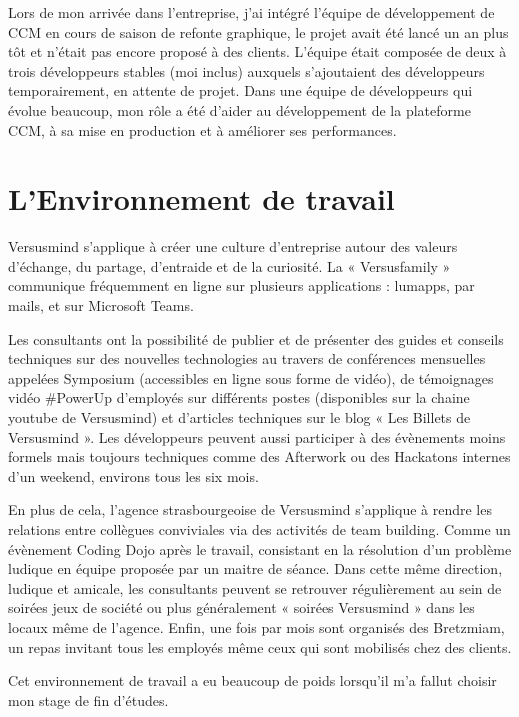 \documentclass[12pt, a4paper]{report}
\newcommand\tab[1][1cm]{\hspace*{#1}}
\begin{document}
Lors de mon arrivée dans l’entreprise, j’ai intégré l’équipe de développement de CCM en cours de
saison de refonte graphique, le projet avait été lancé un an plus tôt et n’était pas encore proposé à des
clients. L’équipe était composée de deux à trois développeurs stables (moi inclus) auxquels s’ajoutaient
des développeurs temporairement, en attente de projet.
Dans une équipe de développeurs qui évolue beaucoup, mon rôle a été d'aider au développement de la plateforme CCM, à sa mise en production et à améliorer ses performances.

\section{L’Environnement de travail}
\tab{}Versusmind s’applique à créer une culture d’entreprise autour des valeurs d’échange, du partage,
d’entraide et de la curiosité. La « Versusfamily » communique fréquemment en ligne sur plusieurs
applications : lumapps, par mails, et sur Microsoft Teams.\newline

Les consultants ont la possibilité de publier et de présenter des guides et conseils techniques sur des
nouvelles technologies au travers de conférences mensuelles appelées Symposium (accessibles en
ligne sous forme de vidéo), de témoignages vidéo \#PowerUp d’employés sur différents postes
(disponibles sur la chaine youtube de Versusmind) et d’articles techniques sur le blog « Les Billets de
Versusmind ». Les développeurs peuvent aussi participer à des évènements moins formels mais
toujours techniques comme des Afterwork ou des Hackatons internes d’un weekend, environs tous les
six mois.\newline

En plus de cela, l’agence strasbourgeoise de Versusmind s’applique à rendre les relations entre
collègues conviviales via des activités de team building. Comme un évènement Coding Dojo après le
travail, consistant en la résolution d’un problème ludique en équipe proposée par un maitre de séance.
Dans cette même direction, ludique et amicale, les consultants peuvent se retrouver régulièrement au
sein de soirées jeux de société ou plus généralement « soirées Versusmind » dans les locaux même de
l’agence. Enfin, une fois par mois sont organisés des Bretzmiam, un repas invitant tous les employés
même ceux qui sont mobilisés chez des clients.\newline

Cet environnement de travail a eu beaucoup de poids lorsqu’il m’a fallut choisir mon stage de fin d'études.
\end{document}
